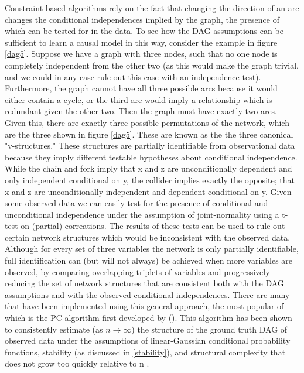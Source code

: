 \documentclass{article}
\begin{document}
Constraint-based algorithms rely on the fact that changing the direction of an arc changes the conditional independences implied by the graph, the presence of which can be tested for in the data. To see how the DAG assumptions can be sufficient to learn a causal model in this way, consider the example in figure \ref{dag5}. Suppose we have a graph with three nodes, such that no one node is completely independent from the other two (as this would make the graph trivial, and we could in any case rule out this case with an independence test). Furthermore, the graph cannot have all three possible arcs because it would either contain a cycle, or the third arc would imply a relationship which is redundant given the other two. Then the graph must have exactly two arcs. Given this, there are exactly three possible permutations of the network, which are the three shown in figure \ref{dag5}. These are known as the the three canonical "v-structures." \parencite{pearl2014probabilistic} These structures are partially identifiable from observational data because they imply different testable hypotheses about conditional independence. While the chain and fork imply that x and z are unconditionally dependent and only independent conditional on y, the collider implies exactly the opposite; that x and z are unconditionally independent and dependent conditional on y. Given some observed data we can easily test for the presence of conditional and unconditional independence under the assumption of joint-normality using a t-test on (partial) correations. The results of these tests can be used to rule out certain network structures which would be inconsistent with the observed data. Although for every set of three variables the network is only partially identifiable, full identification can (but will not always) be achieved when more variables are observed, by comparing overlapping triplets of variables and progressively reducing the set of network structures that are consistent both with the DAG assumptions and with the observed conditional independences. There are many that have been implemented using this general approach, the most popular of which is the PC algorithm first developed by \citeauthor{spirtes2000causation} (\citeyear{spirtes2000causation}). This algorithm has been shown to consistently estimate (as $n \rightarrow \infty$) the structure of the ground truth DAG of observed data under the assumptions of linear-Gaussian conditional probability functions, stability (as discussed in \ref{stability}), and structural complexity that does not grow too quickly relative to n \parencite{kalisch2007estimating}. 
\end{document}
